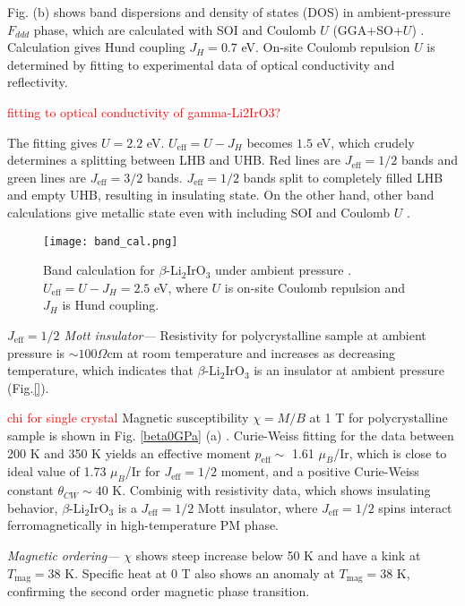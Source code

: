 Fig. (b) shows band dispersions and density of states (DOS) in ambient-pressure $F_{ddd}$ phase, which are calculated with SOI and Coulomb $U$ (GGA+SO+$U$) \cite{}.
Calculation gives Hund coupling $J_H = 0.7$ eV.
On-site Coulomb repulsion $U$ is determined by fitting to experimental data of optical conductivity and reflectivity.

\textcolor{red}{fitting to optical conductivity of gamma-Li2IrO3?}

The fitting gives $U = 2.2$ eV.
$U_\mathrm{eff} = U - J_H$ becomes $1.5$ eV, which crudely
determines a splitting between LHB and UHB.
Red lines are $J_{\mathrm{eff}} = 1/2$ bands and green lines are $J_{\mathrm{eff}} = 3/2$ bands.
$J_{\mathrm{eff}} = 1/2$ bands split to completely filled LHB and empty UHB, resulting in insulating state.
On the other hand, other band calculations give metallic state even with including SOI and Coulomb $U$ \cite{}.

\begin{figure}
  \centering
  \texttt{[image: band\_cal.png]}
  \caption{Band calculation for $\beta$-Li$_2$IrO$_3$ under ambient pressure \cite{veiga2017pressure}. $U_\mathrm{eff} = U - J_H = 2.5$ eV, where $U$ is on-site Coulomb repulsion
  and $J_H$ is Hund coupling.}
  \label{band_cal}
\end{figure}

\vspace{3mm}
\noindent\textit{$J_{\mathrm{eff}} = 1/2$ Mott insulator---} Resistivity for polycrystalline sample at ambient pressure is $\sim 100 \Omega$cm at room temperature and increases as decreasing temperature, which indicates that $\beta$-Li$_2$IrO$_3$ is an insulator at ambient pressure (Fig.\ref{}).

\textcolor{red}{chi for single crystal}
Magnetic susceptibility $\chi = M/B$ at 1 T for polycrystalline sample is shown in Fig. \ref{beta0GPa} (a) \cite{takayama2015hyperhoneycomb}.
Curie-Weiss fitting for the data between 200 K and 350 K yields an effective moment $p_{\mathrm{eff}} \sim$ 1.61 $\mu_B$/Ir, which is close to ideal value of 1.73 $\mu_B$/Ir for $J_{\mathrm{eff}} = 1/2$ moment, and a positive Curie-Weiss constant $\theta_{CW} \sim 40$ K.
Combinig with resistivity data, which shows insulating behavior, $\beta$-Li$_2$IrO$_3$ is a $J_{\mathrm{eff}} = 1/2$ Mott insulator, where $J_{\mathrm{eff}} = 1/2$ spins interact ferromagnetically in high-temperature PM phase.

\vspace{3mm}
\noindent\textit{Magnetic ordering---} $\chi$ shows steep increase below 50 K and have a kink at $T_\mathrm{mag} = 38$ K.
Specific heat at 0 T also shows an anomaly at $T_\mathrm{mag} = 38$ K, confirming the second order magnetic phase transition.

